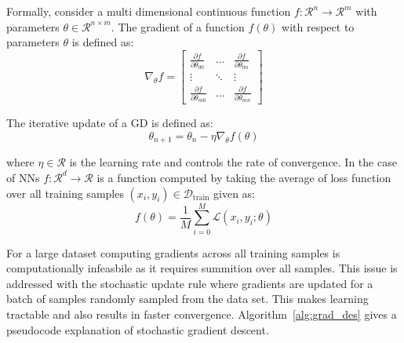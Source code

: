Formally, consider a multi dimensional continuous function $f:\mathcal{R}^n\rightarrow\mathcal{R}^m$ with parameters $\theta\in\mathcal{R}^{n\times m}$. The gradient of a function $f(\theta)$ with respect to parameters $\theta$ is defined as:
\begin{equation}
    \label{eq:jacob}
    \nabla_{\theta} f = \begin{bmatrix}
    \frac{\partial f}{\partial \theta_{00}} & \dots  & \frac{\partial f}{\partial \theta_{0n}} \\
    \vdots & \ddots & \vdots \\
    \frac{\partial f}{\partial \theta_{m0}} & \dots  & \frac{\partial f}{\partial \theta_{mn}}
\end{bmatrix}
\end{equation}

The iterative update of a GD is defined as:
\begin{equation}
    \label{eq:gradupdate}
    \theta_{n+1} = \theta_{n} - \eta \nabla_{\theta}f(\theta)
\end{equation}

where $\eta\in\mathcal{R}$ is the learning rate and controls the rate of convergence. In the case of NNs $f:\mathcal{R}^{d}\rightarrow \mathcal{R}$ is a function computed by taking the average of loss function over all training samples $(x_i,y_i)\in\mathcal{D}_\text{train}$ given as:
\begin{equation}
    f(\theta) = \frac{1}{M}\sum_{i=0}^M\mathcal{L}(x_i, y_i;\theta)
\end{equation}

For a large dataset computing gradients across all training samples is computationally infeasbile as it requires summition over all samples. This issue is addressed with the stochastic update rule where gradients are updated for a batch of samples randomly sampled from the data set. This makes learning tractable and also results in faster convergence. Algorithm~\ref{alg:grad_des} gives a pseudocode explanation of stochastic gradient descent.  

